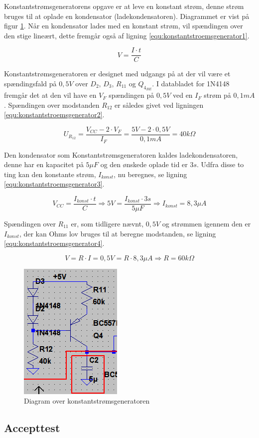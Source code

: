 Konstantstrømsgeneratorens opgave er at leve en konstant strøm, denne strøm bruges til at oplade en kondensator (ladekondensatoren). Diagrammet er vist på figur \ref{fig:volumenkontrol_konstantstroemsgenerator_diagram}. Når en kondensator lades med en konstant strøm, vil spændingen over den stige lineært, dette fremgår også af ligning \ref{equ:konstantstroemsgenerator1}.

\begin{equation}
\label{equ:konstantstroemsgenerator1}
V = \frac{I \cdot t}{C}
\end{equation}

Konstantstrømsgeneratoren er designet med udgangs på at der vil være et spændingsfald på $0,5 V$ over $D_2$, $D_3$, $R_{11}$ og $Q_{4_{BE}}$. I databladet for 1N4148 fremgår det at den vil have en $V_F$ spændingen på $0,5 V$ ved en $I_F$ strøm på $0,1 mA$. Spændingen over modstanden $R_{12}$ er således givet ved ligningen \ref{equ:konstantstroemsgenerator2}.

\begin{equation}
\label{equ:konstantstroemsgenerator2}
U_{R_{12}} = \frac{V_{CC} - 2 \cdot V_F}{I_F} = \frac{5V - 2 \cdot 0,5 V}{0,1 mA} = 40 k\Omega
\end{equation}

Den kondensator som Konstantstrømsgeneratoren kaldes ladekondensatoren, denne har en kapacitet på $5 \mu F$ og den ønskede oplade tid er $3 s$. Udfra disse to ting kan den konstante strøm, $I_{konst}$, nu beregnes, se ligning \ref{equ:konstantstroemsgenerator3}.

\begin{equation}
\label{equ:konstantstroemsgenerator3}
V_{CC} = \frac{I_{konst} \cdot t}{C} \Rightarrow 5 V = \frac{I_{konst} \cdot 3 s}{5 \mu F} \Rightarrow I_{konst} = 8,3 \mu A
\end{equation}

Spændingen over $R_{11}$ er, som tidligere nævnt, $0,5 V$ og strømmen igennem den er $I_{konst}$, der kan Ohms lov bruges til at beregne modstanden, se ligning \ref{equ:konstantstroemsgenerator4}.

\begin{equation}
\label{equ:konstantstroemsgenerator4}
V = R \cdot I = 0,5 V = R \cdot 8,3 \mu A \Rightarrow R = 60 k\Omega
\end{equation}

\begin{figure}[h]
\centering
\includegraphics[scale=.6]{implementering/volumenkontrol/konstantstroemsgenerator.png}
\caption{Diagram over konstantstrømsgeneratoren}
\label{fig:volumenkontrol_konstantstroemsgenerator_diagram}
\end{figure}

\subsection{Accepttest}
\label{volumenkontrol-accepttest}